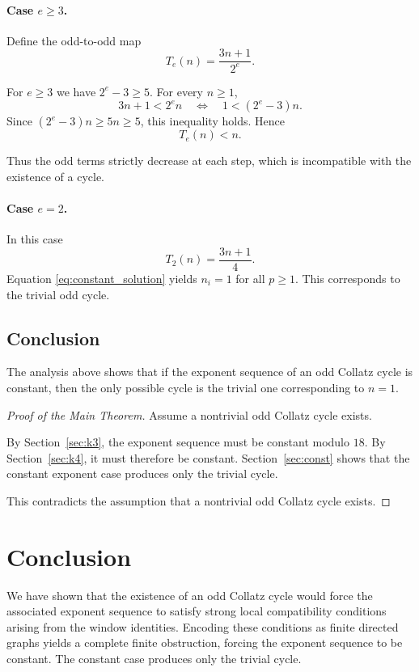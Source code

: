 \documentclass[11pt]{article}
\theoremstyle{definition}
\theoremstyle{plain}
\theoremstyle{remark}
\begin{document}
\paragraph{Case $e\ge3$.}

Define the odd-to-odd map
\[
T_e(n)=\frac{3n+1}{2^e}.
\]

For $e\ge3$ we have $2^e-3\ge5$.
For every $n\ge1$,
\[
3n+1 < 2^e n
\quad\Longleftrightarrow\quad
1 < (2^e-3)n.
\]
Since $(2^e-3)n\ge5n\ge5$, this inequality holds.
Hence
\[
T_e(n)<n.
\]

Thus the odd terms strictly decrease at each step,
which is incompatible with the existence of a cycle.

\paragraph{Case $e=2$.}

In this case
\[
T_2(n)=\frac{3n+1}{4}.
\]
Equation \eqref{eq:constant_solution} yields $n_i=1$ for all $p\ge1$.
This corresponds to the trivial odd cycle.

\subsection{Conclusion}

The analysis above shows that if the exponent sequence of an odd Collatz
cycle is constant, then the only possible cycle is the trivial one
corresponding to $n=1$.

\begin{proof}[Proof of the Main Theorem]
Assume a nontrivial odd Collatz cycle exists.

By Section~\ref{sec:k3}, the exponent sequence must be constant modulo $18$.
By Section~\ref{sec:k4}, it must therefore be constant.
Section~\ref{sec:const} shows that the constant exponent case produces
only the trivial cycle.

This contradicts the assumption that a nontrivial odd Collatz cycle exists.
\end{proof}

\section*{Conclusion}

We have shown that the existence of an odd Collatz cycle would force the
associated exponent sequence to satisfy strong local compatibility
conditions arising from the window identities.
Encoding these conditions as finite directed graphs yields a complete
finite obstruction, forcing the exponent sequence to be constant.
The constant case produces only the trivial cycle.
\end{document}
